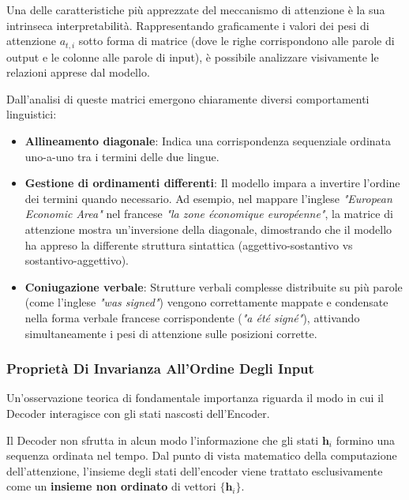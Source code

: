 ﻿\documentclass[11pt, a4paper]{article}
\begin{document}
Una delle caratteristiche più apprezzate del meccanismo di attenzione è la sua intrinseca interpretabilità. Rappresentando graficamente i valori dei pesi di attenzione $a_{t,i}$ sotto forma di matrice (dove le righe corrispondono alle parole di output e le colonne alle parole di input), è possibile analizzare visivamente le relazioni apprese dal modello.


Dall'analisi di queste matrici emergono chiaramente diversi comportamenti linguistici:
\begin{itemize}
    \item \textbf{Allineamento diagonale}: Indica una corrispondenza sequenziale ordinata uno-a-uno tra i termini delle due lingue.
    \item \textbf{Gestione di ordinamenti differenti}: Il modello impara a invertire l'ordine dei termini quando necessario. Ad esempio, nel mappare l'inglese \emph{"European Economic Area"} nel francese \emph{"la zone économique européenne"}, la matrice di attenzione mostra un'inversione della diagonale, dimostrando che il modello ha appreso la differente struttura sintattica (aggettivo-sostantivo vs sostantivo-aggettivo).
    \item \textbf{Coniugazione verbale}: Strutture verbali complesse distribuite su più parole (come l'inglese \emph{"was signed"}) vengono correttamente mappate e condensate nella forma verbale francese corrispondente (\emph{"a été signé"}), attivando simultaneamente i pesi di attenzione sulle posizioni corrette.
\end{itemize}

\subsubsection{Proprietà Di Invarianza All'Ordine Degli Input}

Un'osservazione teorica di fondamentale importanza riguarda il modo in cui il Decoder interagisce con gli stati nascosti dell'Encoder.


Il Decoder non sfrutta in alcun modo l'informazione che gli stati $\bm{h}_i$ formino una sequenza ordinata nel tempo. Dal punto di vista matematico della computazione dell'attenzione, l'insieme degli stati dell'encoder viene trattato esclusivamente come un \textbf{insieme non ordinato} di vettori $\{\bm{h}_i\}$.
\end{document}
